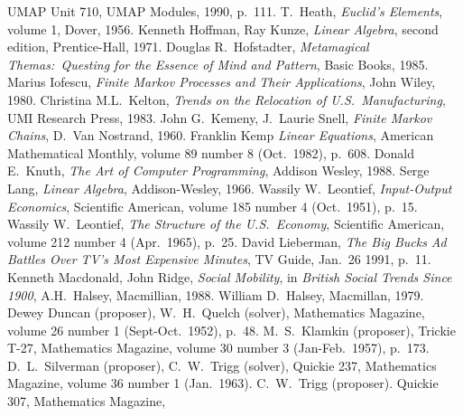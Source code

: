 \begin{thebibliography}{\makebox[2em][c]{{}\hfil{}}}
  UMAP Unit 710,
  UMAP Modules, 1990,
  p.~111.
  T.\ Heath,
  \emph{Euclid's Elements},
  volume 1,
  Dover,
  1956.
  Kenneth Hoffman, Ray Kunze,
  \emph{Linear Algebra},
  second edition,
  Prentice-Hall,
  1971.
 Douglas R.~Hofstadter,
 \emph{Metamagical Themas:~Questing for the Essence of Mind and Pattern},
 Basic Books,
 1985.
  Marius Iofescu,
  \emph{Finite Markov Processes and Their Applications},
  John Wiley, 1980.
  Christina M.L.~Kelton,
  \emph{Trends on the Relocation of U.S.\ Manufacturing},
  UMI Research Press, 1983.
  John G.~Kemeny, J.~Laurie Snell,
  \emph{Finite Markov Chains},
  D.~Van Nostrand, 1960.
  Franklin Kemp
  \emph{Linear Equations},
  American Mathematical Monthly,
  volume 89 number 8 (Oct.\ 1982),
  p.~608.
  Donald E.~Knuth,
  \emph{The Art of Computer Programming},
  Addison Wesley,
  1988.     
  Serge Lang,
  \emph{Linear Algebra},
  Addison-Wesley,
  1966.
  Wassily W.\ Leontief,
  \emph{Input-Output Economics},
  Scientific American,
  volume 185 number 4 (Oct.\ 1951),
  p.~15. 
  Wassily W.\ Leontief,
  \emph{The Structure of the U.S.\ Economy},
  Scientific American,
  volume 212 number 4 (Apr.\ 1965),
  p.~25. 
  David Lieberman,
  \emph{The Big Bucks Ad Battles Over TV's Most Expensive Minutes},
  TV Guide,
  Jan.\ 26 1991,
  p.~11.
  Kenneth Macdonald, John Ridge,
  \emph{Social Mobility},
  in \emph{British Social Trends Since 1900},
  A.H.~Halsey,
  Macmillian, 1988.
  William D.~Halsey,
  Macmillan, 1979.
  Dewey Duncan (proposer), W.\ H.\ Quelch (solver),
  Mathematics Magazine,
  volume 26 number 1 (Sept-Oct.\ 1952),
  p.~48.
  M.\ S.\ Klamkin (proposer),
  Trickie T-27,
  Mathematics Magazine,
  volume 30 number 3 (Jan-Feb.\ 1957),
  p.~173.
  D.\ L.\ Silverman (proposer), C.\ W.\ Trigg (solver),
  Quickie 237,
  Mathematics Magazine,
  volume 36 number 1 (Jan.\ 1963).
  C.\ W.\ Trigg (proposer).
  Quickie 307,
  Mathematics Magazine,

\end{thebibliography}
